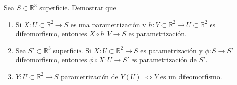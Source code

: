 \begin{ejr}
  Sea $S \subset \mathbb{R}^{3}$ superficie. Demostrar que
  \begin{enumerate}
    \item Si $X : U \subset \mathbb{R}^{2} \to S$ es una parametrización y $h : V \subset \mathbb{R}^{2} \to U \subset \mathbb{R}^{2}$ es difeomorfismo, entonces $X \circ h : V \to S$ es parametrización.
    \item Sea $S' \subset \mathbb{R}^{3}$ superficie. Si $X : U \subset \mathbb{R}^{2} \to S$ es parametrización y $\phi : S \to S'$ difeomorfismo, entonces $\phi \circ X : U \to S'$ es parametrización de $S'$.
    \item $Y : U \subset \mathbb{R}^{2} \to S$ parametrización de $Y(U)$ $\Leftrightarrow Y$ es un difeomorfismo.
  \end{enumerate}
\end{ejr}

